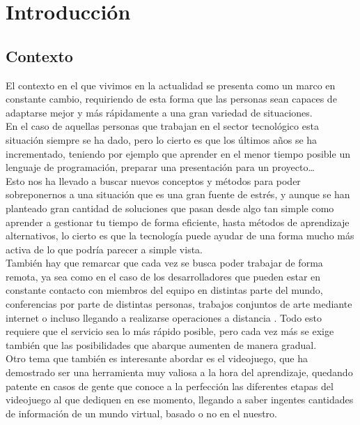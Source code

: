 \section{Introducción}

\subsection{Contexto}
\justify
\quad El contexto en el que vivimos en la actualidad se presenta como un marco en constante cambio, requiriendo de esta forma que las personas sean capaces de adaptarse mejor y más rápidamente a una gran variedad de situaciones.\\

\quad En el caso de aquellas personas que trabajan en el sector tecnológico esta situación siempre se ha dado, pero lo cierto es que los últimos años se ha incrementado, teniendo por ejemplo que aprender en el menor tiempo posible un lenguaje de programación, preparar una presentación para un proyecto…\\

\quad Esto nos ha llevado a buscar nuevos conceptos y métodos para poder sobreponernos a una situación que es una gran fuente de estrés, y aunque se han planteado gran cantidad de soluciones que pasan desde algo tan simple como aprender a gestionar tu tiempo de forma eficiente, hasta métodos de aprendizaje alternativos, lo cierto es que la tecnología puede ayudar de una forma mucho más activa de lo que podría parecer a simple vista.\\ 

\quad También hay que remarcar que cada vez se busca poder trabajar de forma remota, ya sea como en el caso de los desarrolladores que pueden estar en constante contacto con miembros del equipo en distintas parte del mundo, conferencias por parte de distintas personas, trabajos conjuntos de arte mediante internet o incluso  llegando a realizarse operaciones a distancia \cite{BBC}. Todo esto requiere que el servicio sea lo más rápido posible, pero cada vez más se exige también que las posibilidades que abarque aumenten de manera gradual.\\ 

\quad Otro tema que también es interesante abordar es el videojuego, que ha demostrado ser una herramienta muy valiosa a la hora del aprendizaje, quedando patente en casos de gente que conoce a la perfección las diferentes etapas del videojuego al que dediquen en ese momento, llegando a saber ingentes cantidades de información de un mundo virtual, basado o no en el nuestro.\\

